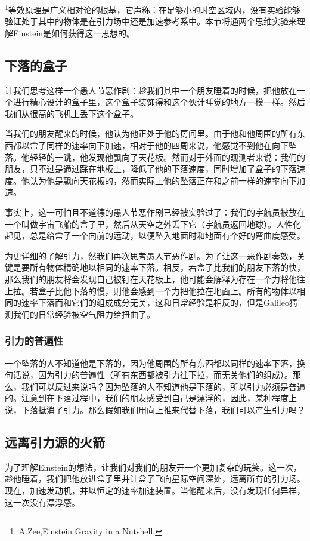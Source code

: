 
\footnote{ A.Zee,Einstein Gravity in a Nutshell.}等效原理是广义相对论的根基，它声称：在足够小的时空区域内，没有实验能够验证处于其中的物体是在引力场中还是加速参考系中。本节将通两个思维实验来理解Einstein是如何获得这一思想的。

\subsection{下落的盒子}
让我们思考这样一个愚人节恶作剧：趁我们其中一个朋友睡着的时候，把他放在一个进行精心设计的盒子里，这个盒子装饰得和这个伙计睡觉的地方一模一样。然后我们从很高的飞机上丢下这个盒子。

当我们的朋友醒来的时候，他认为他正处于他的房间里。由于他和他周围的所有东西都以盒子同样的速率向下加速，相对于他的四周来说，他感觉不到他在向下坠落。他轻轻的一跳，他发现他飘向了天花板。然而对于外面的观测者来说：我们的朋友，只不过是通过踩在地板上，降低了他的下落速度，同时增加了盒子的下落速度。他认为他是飘向天花板的，然而实际上他的坠落正在和之前一样的速率向下加速。

事实上，这一可怕且不道德的愚人节恶作剧已经被实验过了：我们的宇航员被放在一个叫做宇宙飞船的盒子里，然后从天空之外丢下它（宇航员返回地球）。人性化起见，总是给盒子一个向前的运动，以便坠入地面时和地面有个好的弯曲度感受。

为更详细的了解引力，然我们再次思考愚人节恶作剧。为了让这一恶作剧奏效，关键是要所有物体精确地以相同的速率下落。相反，若盒子比我们的朋友下落的快，那么我们的朋友将会发现自己被钉在天花板上，他可能会解释为存在一个力将他往上拉。若盒子比他下落的慢，则他会感到一个力把他拉在地面上。所有的物体以相同的速率下落而和它们的组成成分无关，这和日常经验是相反的，但是Galileo猜测我们的日常经验被空气阻力给扭曲了。

\subsubsection{引力的普遍性}
一个坠落的人不知道他是下落的，因为他周围的所有东西都以同样的速率下落，换句话说，因为引力的普遍性（所有东西都被引力往下拉，而无关他们的组成）。那么，我们可以反过来说吗？因为坠落的人不知道他是下落的，所以引力必须是普遍的。注意到在下落过程中，我们的朋友感受到自己是漂浮的，因此，某种程度上说，下落抵消了引力。那么假如我们用向上推来代替下落，我们可以产生引力吗？

\subsection{远离引力源的火箭}
为了理解Einstein的想法，让我们对我们的朋友开一个更加复杂的玩笑。这一次，趁他睡着，我们把他放进盒子里并让盒子飞向星际空间深处，远离所有的引力场。现在，加速发动机，并以恒定的速率加速装置。当他醒来后，没有发现任何异样，这一次没有漂浮感。

